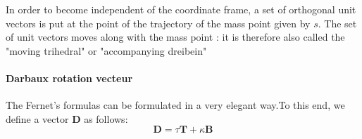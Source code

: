 \documentclass[12pt]{book}
\theoremstyle{definition}\newtheorem{dfn}{Définition}[chapter]
\theoremstyle{plain}\newtheorem{thm}{Théorème}[chapter]
\theoremstyle{plain}\newtheorem{prp}{Proposition}[chapter]
\theoremstyle{plain}\newtheorem{lem}{\bf Lemme}[chapter]
\theoremstyle{plain}\newtheorem{axm}{\bf Axiome}[chapter]
\theoremstyle{plain}\newtheorem{lmm}{\bf Lemme}[chapter]
\theoremstyle{plain}\newtheorem{cor}{\bf Corollaire}[chapter]
\theoremstyle{remark}\newtheorem{rem}{Remarque}[chapter]
\begin{document}
In order to become independent of the coordinate frame, a set of orthogonal unit vectors
is put at the point of the trajectory of the mass point given by $s$.
The set of unit vectors moves along with the mass point : it is therefore also called the "moving trihedral" or "accompanying dreibein"
\paragraph{Darbaux rotation vecteur}
The Fernet's formulas can be formulated in a very elegant way.To this end, we define a vector $\mathbf{D}$ as follows:
$$\mathbf{D}=\tau \mathbf{T}+\kappa \mathbf{B}$$
\end{document}
